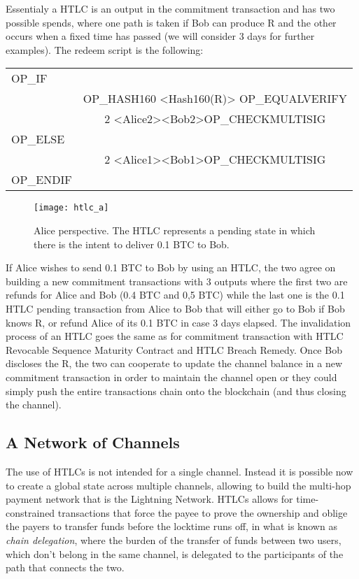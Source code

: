 		Essentialy a HTLC is an output in the commitment transaction and has two possible spends, where one path is taken if Bob can produce R and the other occurs when a fixed time has passed (we will consider 3 days for further examples). The redeem script is the following:
		\begin{center}
			\begin{tabulary}{\textwidth}{|L|C|}
				\hline
				OP\_IF & \\
				 & OP\_HASH160 <Hash160(R)> OP\_EQUALVERIFY \\
				 & 2 <Alice2><Bob2>OP\_CHECKMULTISIG \\ \hline
				OP\_ELSE & \\
				 & 2 <Alice1><Bob1>OP\_CHECKMULTISIG \\ \hline
				 OP\_ENDIF & \\
				 \hline				 
			\end{tabulary}
		\end{center}
	
		\begin{figure}
			\centering
			\texttt{[image: htlc\_a]}
			\caption{Alice perspective. The HTLC represents a pending state in which there is the intent to deliver 0.1 BTC to Bob.}
			\label{htlc_a}
		\end{figure}
	
		If Alice wishes to send 0.1 BTC to Bob by using an HTLC, the two agree on building a new commitment transactions with 3 outputs where the first two are refunds for Alice and Bob (0.4 BTC and 0,5 BTC) while the last one is the 0.1 HTLC pending transaction from Alice to Bob that will either go to Bob if Bob knows R, or refund Alice of its 0.1 BTC in case 3 days elapsed. The invalidation process of an HTLC goes the same as for commitment transaction with HTLC Revocable Sequence Maturity Contract and HTLC Breach Remedy. Once Bob discloses the R, the two can cooperate to update the channel balance in a new commitment transaction in order to maintain the channel open or they could simply push the entire transactions chain onto the blockchain (and thus closing the channel).
		
		\subsection{A Network of Channels}
		
		The use of HTLCs is not intended for a single channel. Instead it is possible now to create a global state across multiple channels, allowing to build the multi-hop payment network that is the Lightning Network. HTLCs allows for time-constrained transactions that force the payee to prove the ownership and oblige the payers to transfer funds before the locktime runs off, in what is known as \textit{chain delegation}, where the burden of the transfer of funds between two users, which don't belong in the same channel, is delegated to the participants of the path that connects the two.


